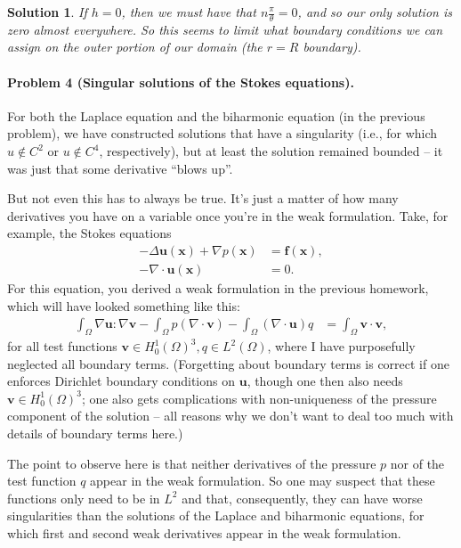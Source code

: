 \documentclass[leqno]{article}
\theoremstyle{nonumberplain}
\newtheorem{solution}{Solution}
\begin{document}
\begin{solution}
If $h=0$, then we must have that $n\frac{\pi}{\theta}=0$, and so our only solution is zero almost everywhere. So this seems to limit what boundary conditions we can assign on the outer portion of our domain (the $r=R$ boundary).


 

\end{solution}
\pagebreak


\paragraph{Problem 4 (Singular solutions of the Stokes equations).}
For both the Laplace equation and the biharmonic equation (in the
previous problem), we have constructed solutions that have a
singularity (i.e., for which $u\not\in C^2$ or $u\not\in C^4$,
respectively), but at least the solution remained bounded -- it was
just that some derivative ``blows up''.

But not even this has to always be true. It's just a matter of how
many derivatives you have on a variable once you're in the weak
formulation. Take, for example, the Stokes equations
\begin{align*}
  -\Delta \mathbf u(\mathbf x) + \nabla p(\mathbf x) &= \mathbf f(\mathbf x),
  \\
  -\nabla\cdot \mathbf u(\mathbf x) &= 0.
\end{align*}
For this equation, you derived a weak formulation in the previous
homework, which will have looked something like this:
\begin{align*}
  \int_\Omega \nabla \mathbf u : \nabla \mathbf v
  -
  \int_\Omega p (\nabla \cdot \mathbf v)
  -
  \int_\Omega (\nabla\cdot \mathbf u) q
  &=
  \int_\Omega \mathbf v \cdot \mathbf v,
\end{align*}
for all test functions $\mathbf v \in H^1_0(\Omega)^3, q\in
L^2(\Omega)$, where I have purposefully neglected all boundary
terms. (Forgetting about boundary terms is correct if one enforces
Dirichlet boundary conditions on $\mathbf u$, though one then also
needs $\mathbf v\in H^1_0(\Omega)^3$; one also gets complications with
non-uniqueness of the pressure component of the solution -- all
reasons why we don't want to deal too much with details of boundary terms here.)

The point to observe here is that neither derivatives of the pressure
$p$ nor of the test function $q$ appear in the weak formulation. So
one may suspect that these functions only need to be in $L^2$ and
that, consequently, they can have worse singularities than the
solutions of the Laplace and biharmonic equations, for which first and
second weak derivatives appear in the weak formulation.
\end{document}
